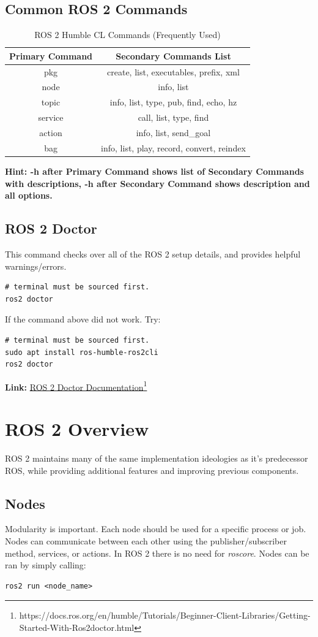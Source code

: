\documentclass[11pt]{article}
\newcommand{\link}[2]{\textbf{Link: }\textcolor{blue}{\href{#2}{#1}}\footnote{#2}}
\begin{document}
\subsection{Common ROS 2 Commands}
\begin{table}[H]
	\caption{ROS 2 Humble CL Commands (Frequently Used)}
	\begin{center}
		\begin{tabular}{c|c}
			Primary Command & Secondary Commands List\\
			\hline
			pkg & create, list, executables, prefix, xml\\
			node & info, list\\
			topic & info, list, type, pub, find, echo, hz\\
			service	& call, list, type, find\\
			action & info, list, send\_goal\\
			bag & info, list, play, record, convert, reindex\\
		\end{tabular}
	\end{center}
\textbf{Hint: -h after Primary Command shows list of Secondary Commands with descriptions, -h after Secondary Command shows description and all options.}
\end{table}

\subsection{ROS 2 Doctor}
This command checks over all of the ROS 2 setup details, and provides helpful warnings/errors.
\begin{lstlisting}
# terminal must be sourced first.
ros2 doctor
\end{lstlisting}
If the command above did not work. Try:
\begin{lstlisting}
# terminal must be sourced first.
sudo apt install ros-humble-ros2cli
ros2 doctor
\end{lstlisting}
\link{ROS 2 Doctor Documentation}{https://docs.ros.org/en/humble/Tutorials/Beginner-Client-Libraries/Getting-Started-With-Ros2doctor.html}


\section{ROS 2 Overview}
ROS 2 maintains many of the same implementation ideologies as it's predecessor ROS, while providing additional features and improving previous components. 
\subsection{Nodes}
Modularity is important. Each node should be used for a specific process or job. Nodes can communicate between each other using the publisher/subscriber method, services, or actions. In ROS 2 there is no need for \textit{roscore}. Nodes can be ran by simply calling:
\begin{lstlisting}
ros2 run <node_name>
\end{lstlisting}
\end{document}
